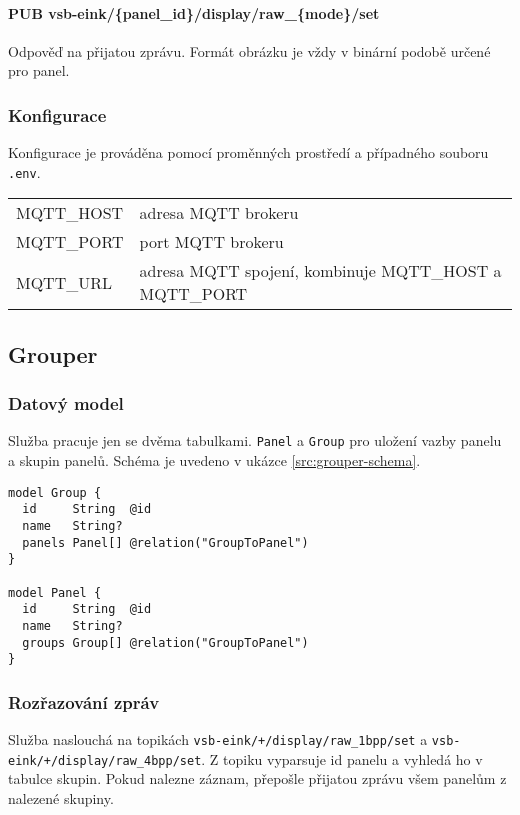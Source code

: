 \paragraph*{PUB vsb-eink/\{panel\_id\}/display/raw\_\{mode\}/set}
Odpověď na přijatou zprávu. Formát obrázku je vždy v binární podobě určené pro panel.

\subsubsection{Konfigurace}
Konfigurace je prováděna pomocí proměnných prostředí a případného souboru \lstinline{.env}.
\begin{table}[h]
    \begin{tabular}{ll}
        MQTT\_HOST & adresa MQTT brokeru \\
        MQTT\_PORT & port MQTT brokeru \\
        MQTT\_URL & adresa MQTT spojení, kombinuje MQTT\_HOST a MQTT\_PORT \\
    \end{tabular}
\end{table}

\subsection{Grouper}
\subsubsection{Datový model}
Služba pracuje jen se dvěma tabulkami. \lstinline|Panel| a \lstinline|Group| pro uložení vazby panelu a skupin panelů. Schéma je uvedeno v ukázce \ref{src:grouper-schema}.

\begin{lstlisting}[label=src:grouper-schema,caption={Schéma datového modelu služby Grouper}]
model Group {
  id     String  @id
  name   String?
  panels Panel[] @relation("GroupToPanel")
}

model Panel {
  id     String  @id
  name   String?
  groups Group[] @relation("GroupToPanel")
}
\end{lstlisting}

\subsubsection{Rozřazování zpráv}
Služba naslouchá na topikách \lstinline|vsb-eink/+/display/raw_1bpp/set| a \lstinline|vsb-eink/+/display/raw_4bpp/set|. Z topiku vyparsuje id panelu a vyhledá ho v tabulce skupin. Pokud nalezne záznam, přepošle přijatou zprávu všem panelům z nalezené skupiny.

